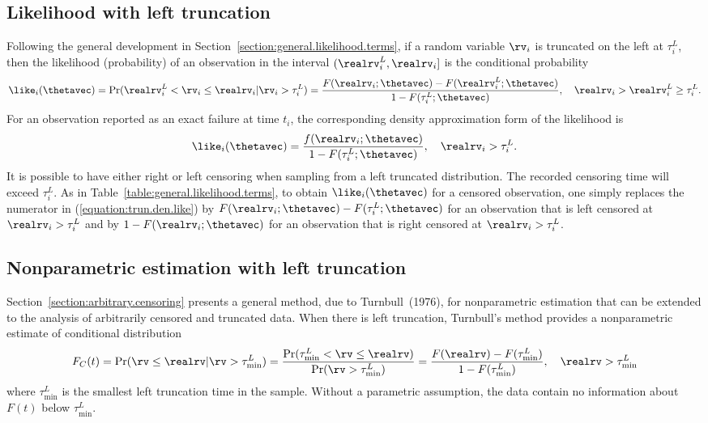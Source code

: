 \subsection{Likelihood with left truncation}
\label{section:likemeth.le}
Following the general development in
Section~\ref{section:general.likelihood.terms}, if a random variable
$\rv_{i}$ is truncated on the left at $\tau^{L}_{i}$, then the
likelihood (probability) of an observation in the interval
$(\realrv^{L}_{i}, \realrv_{i}]$ is the conditional probability
\begin{displaymath}
\like_{i}(\thetavec)=\Pr(\realrv^{L}_{i} <  \rv_{i} \leq \realrv_{i} |
\rv_{i} > \tau^{L}_{i}) =
\frac{F(\realrv_{i};\thetavec)-F(\realrv^{L}_{i};\thetavec)}
{1-F(\tau^{L}_{i};\thetavec)},\quad \realrv_{i} > \realrv_{i}^{L} \geq \tau_{i}^{L}.
\end{displaymath}
For an observation reported as an exact failure at time $t_{i}$, the
corresponding density approximation form of the likelihood is
\begin{equation}
\label{equation:trun.den.like}
\like_{i}(\thetavec)=
\frac{f(\realrv_{i};\thetavec)}
{1-F(\tau^{L}_{i};\thetavec)}, \quad \realrv_{i} > \tau^{L}_{i}.
\end{equation}
It is possible to have either right or left censoring when sampling
from a left truncated distribution. The recorded censoring time will
exceed $\tau_{i}^{L}$.  As in
Table~\ref{table:general.likelihood.terms}, to obtain
$\like_{i}(\thetavec)$ for a censored observation, one simply replaces
the numerator in (\ref{equation:trun.den.like}) by
$F(\realrv_{i};\thetavec)-F(\tau^{L}_{i};\thetavec)$ for an observation that is left censored at
$\realrv_{i} > \tau^{L}_{i}$ and by $1-F(\realrv_{i};\thetavec)$ for an observation
that is right censored at $\realrv_{i} > \tau^{L}_{i} $.

\subsection{Nonparametric estimation with left truncation}
\label{section:cond.left.trun.prob}
Section~\ref{section:arbitrary.censoring} presents a general method,
due to Turnbull~(1976), for nonparametric estimation that can be
extended to the analysis of arbitrarily censored and truncated data.
When there is left truncation, Turnbull's method
provides a nonparametric estimate of
conditional distribution
\begin{equation}
\label{equation:cond.left.trun.prob}
F_{C}(t) = \Pr( \rv \leq \realrv |\rv > \tau^{L}_{\min}) =
       \frac{\Pr(\tau^{L}_{\min} < \rv \leq \realrv)}{\Pr( \rv >
       \tau^{L}_{\min} ) } = \frac{F(\realrv) -F(\tau^{L}_{\min})
       }{1-F(\tau^{L}_{\min})},\quad \realrv > \tau^{L}_{\min}
\end{equation}
where $\tau^{L}_{\min}$ is the smallest left truncation time in the
sample.  Without a parametric assumption, the data contain no
information about $F(t)$ below $\tau^{L}_{\min}$.

